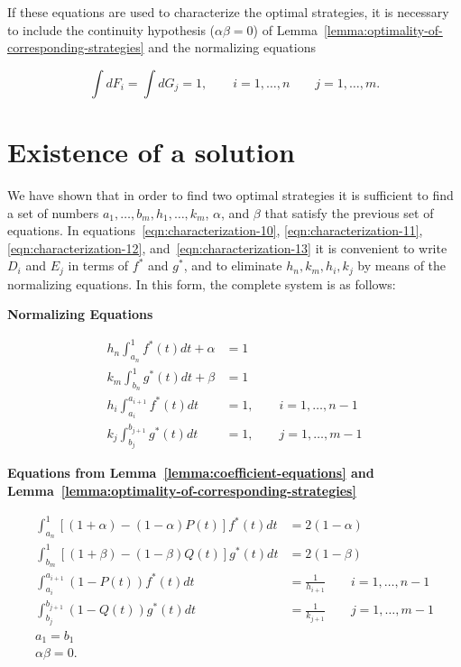 \documentclass{article}
\theoremstyle{remark}
\begin{document}
If these equations are used to characterize the optimal strategies, it is
necessary to include the continuity hypothesis ($\alpha \beta = 0$) of
Lemma~\ref{lemma:optimality-of-corresponding-strategies} and the normalizing
equations

\[
\int dF_i = \int dG_j = 1, \qquad i = 1, \dots, n \qquad j = 1, \dots, m.
\]

\section{Existence of a solution}

We have shown that in order to find two optimal strategies it is sufficient to
find a set of numbers $a_1, \dots, b_m, h_1, \dots, k_m$, $\alpha$, and
$\beta$ that satisfy the previous set of equations. In
equations~\ref{eqn:characterization-10}, \ref{eqn:characterization-11},
\ref{eqn:characterization-12}, and~\ref{eqn:characterization-13} it is
convenient to write $D_i$ and $E_j$ in terms of $f^*$ and $g^*$, and to
eliminate $h_n, k_m, h_i, k_j$ by means of the normalizing equations. In this
form, the complete system is as follows:

\textbf{Normalizing Equations}

\begin{align}
h_n \int_{a_n}^1 f^*(t) dt + \alpha &= 1 \label{eqn:existence-14} \\
k_m \int_{b_n}^1 g^*(t) dt + \beta &= 1 \label{eqn:existence-15} \\
h_i \int_{a_i}^{a_{i+1}} f^*(t) dt &= 1, \qquad i=1, \dots, n-1 \label{eqn:existence-16} \\
k_j \int_{b_j}^{b_{j+1}} g^*(t) dt &= 1, \qquad j=1, \dots, m-1 \label{eqn:existence-17}
\end{align}

\textbf{Equations from Lemma~\ref{lemma:coefficient-equations} and
Lemma~\ref{lemma:optimality-of-corresponding-strategies}}

\begin{align}
\int_{a_n}^1 \left [ (1+\alpha) - (1-\alpha)P(t) \right ] f^*(t) dt &= 2(1-\alpha) \label{eqn:existence-18} \\
\int_{b_m}^1 \left [ (1+\beta) - (1-\beta)Q(t) \right ] g^*(t) dt &= 2(1-\beta) \label{eqn:existence-19} \\
\int_{a_{i}}^{a_{i+1}} (1-P(t))f^*(t) dt &= \frac{1}{h_{i+1}} \qquad i = 1,
\dots, n-1 \label{eqn:existence-20} \\
\int_{b_{j}}^{b_{j+1}} (1-Q(t))g^*(t) dt &= \frac{1}{k_{j+1}} \qquad j=1,
\dots, m-1 \label{eqn:existence-21} \\
a_1 = b_1 \label{eqn:existence-22} \\
\alpha \beta = 0. \label{eqn:existence-23}
\end{align}
\end{document}
